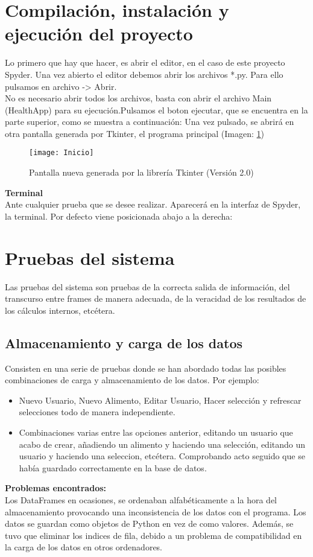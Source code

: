 \section{Compilación, instalación y ejecución del proyecto}
Lo primero que hay que hacer, es abrir el editor, en el caso de este proyecto Spyder. Una vez abierto el editor debemos abrir los archivos *.py. Para ello pulsamos en archivo -> Abrir.\\
No es necesario abrir todos los archivos, basta con abrir el archivo Main (HealthApp) para su ejecución.Pulsamos el boton ejecutar, que se encuentra en la parte superior,  como se muestra a continuación:
Una vez pulsado, se abrirá en otra pantalla generada por Tkinter, el programa principal (Imagen: \ref{fig:Inicio})\\
\begin{figure}[htb]
\centering
\texttt{[image: Inicio]} 
\caption{Pantalla nueva generada por la librería Tkinter (Versión 2.0)}
\label{fig:Inicio}
\end{figure}
\textbf{Terminal}\\
Ante cualquier prueba que se desee realizar. Aparecerá en la interfaz de Spyder, la terminal. Por defecto viene posicionada abajo a la derecha:
\section{Pruebas del sistema}
Las pruebas del sistema son pruebas de la correcta salida de información, del transcurso entre frames de manera adecuada, de la veracidad de los resultados de los cálculos internos, etcétera.
\subsection{Almacenamiento y carga de los datos}
Consisten en una serie de pruebas donde se han abordado todas las posibles combinaciones de carga y almacenamiento de los datos. Por ejemplo:
\begin{itemize}
\item Nuevo Usuario, Nuevo Alimento, Editar Usuario, Hacer selección y refrescar selecciones todo de manera independiente.
\item Combinaciones varias entre las opciones anterior, editando un usuario que acabo de crear, añadiendo un alimento y haciendo una selección, editando un usuario y haciendo una seleccion, etcétera. Comprobando acto seguido que se había guardado correctamente en la base de datos.
\end{itemize}
\textbf{Problemas encontrados:}\\
Los DataFrames en ocasiones, se ordenaban alfabéticamente a la hora del almacenamiento provocando una inconsistencia de los datos con el programa. Los datos se guardan como objetos de Python en vez de como valores. Además, se tuvo que eliminar los indices de fila, debido a un problema de compatibilidad en la carga de los datos en otros ordenadores.

